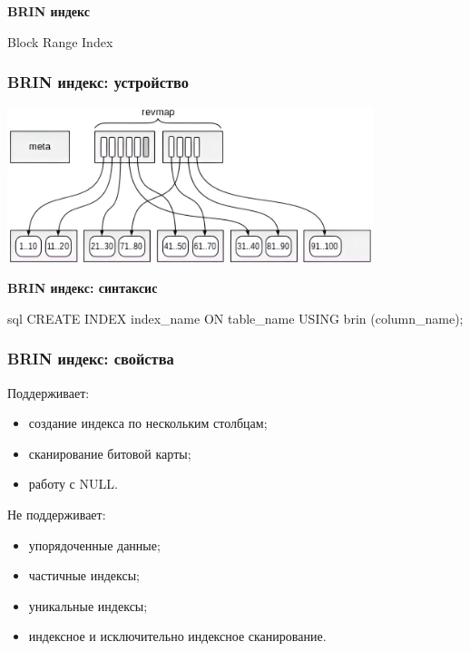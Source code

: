 \documentclass[aspectratio=169]{beamer}
\begin{document}
\begin{frame}
  \vspace*{1em}
  \begin{center}
    {\huge \textbf{BRIN индекс}}

    \vspace*{1em}

    Block Range Index
  \end{center}
\end{frame}

\begin{frame}
  \frametitle{BRIN индекс: устройство}

  \centering
  \includegraphics[width=0.8\textwidth]{images/brin/blocks.png}
\end{frame}

\begin{frame}[fragile]
  \begin{center}
    {\Large \textbf{BRIN индекс: синтаксис}}

    \vspace*{1em}

    \begin{cminted}{sql}
      CREATE INDEX index_name ON table_name USING brin (column_name);
    \end{cminted}
  \end{center}
\end{frame}

\begin{frame}
  \frametitle{BRIN индекс: свойства}

  Поддерживает:
  \begin{itemize}
    \item создание индекса по нескольким столбцам;
    \item сканирование битовой карты;
    \item работу с NULL.
  \end{itemize}

  Не поддерживает:
  \begin{itemize}
    \item упорядоченные данные;
    \item частичные индексы;
    \item уникальные индексы;
    \item индексное и исключительно индексное сканирование.
  \end{itemize}
\end{frame}
\end{document}
